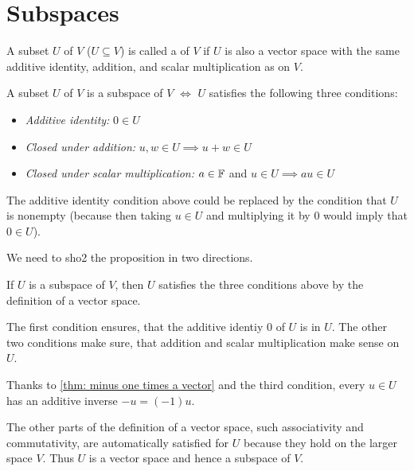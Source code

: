 \section{Subspaces}

\begin{mydef} [subspace]
  A subset $U$ of $V$ ($U \subseteq V$) is called a  of $V$ if $U$ is also a vector space with the same additive identity, addition, and scalar multiplication as on $V$.
\end{mydef}

\begin{thm} 
  A subset $U$ of $V$ is a subspace of $V$ $\iff$ $U$ satisfies the following three conditions:
  \begin{itemize}
    \item \emph{Additive identity:}
    $0 \in U$
    \item \emph{Closed under addition:}
    $u,w \in U \implies u+w \in U$
    \item \emph{Closed under scalar multiplication:}
    $a \in \mathbb{F}$ and $u \in U \implies au \in U$
  \end{itemize}
  The additive identity condition above could be replaced by the condition that $U$ is nonempty (because then taking $u \in U$ and multiplying it by $0$ would imply that $0\in U$).
\end{thm}
\begin{prf} We need to sho2 the proposition in two directions.
  \begin{description}
    \item{} If $U$ is a subspace of $V$, then $U$ satisfies the three conditions above by the definition of a vector space.
    \item{} The first condition ensures, that the additive identiy $0$ of $U$ is in $U$. The other two conditions make sure, that addition and scalar multiplication make sense on $U$.

    Thanks to \ref{thm: minus one times a vector} and the third condition, every $u \in U$ has an additive inverse $-u = (-1) u$.

    The other parts of the definition of a vector space, such associativity and commutativity, are automatically satisfied for $U$ because they hold on the larger space $V$. Thus $U$ is a vector space and hence a subspace of $V$.
  \end{description}
  \vspace{-1.1em}
\end{prf}


